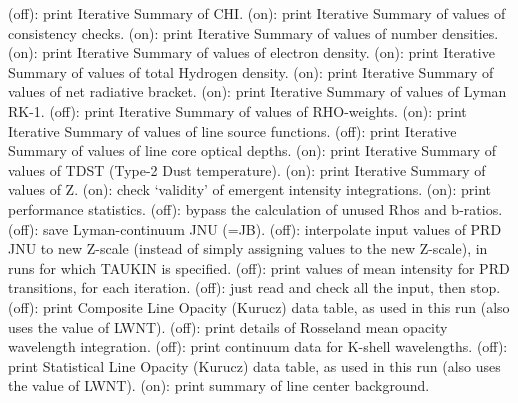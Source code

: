 \space \vbox { (off): \bang
print Iterative Summary of CHI.}
\space \vbox { (on): \bang
print Iterative Summary of values of consistency checks.}
\space \vbox { (on): \bang
print Iterative Summary of values of number densities.}
\space \vbox { (on): \bang
print Iterative Summary of values of electron density.}
\space \vbox { (on): \bang
print Iterative Summary of values of total Hydrogen density.}
\space \vbox { (on): \bang
print Iterative Summary of values of net radiative bracket.}
\space \vbox { (on): \bang
print Iterative Summary of values of Lyman RK-1.}
\space \vbox { (off): \bang
print Iterative Summary of values of RHO-weights.}
\space \vbox { (on): \bang
print Iterative Summary of values of line source functions.}
\space \vbox { (off): \bang
print Iterative Summary of values of line core optical depths.}
\space \vbox { (on): \bang
print Iterative Summary of values of TDST (Type-2 Dust temperature).}
\space \vbox { (on): \bang
print Iterative Summary of values of Z.}
\space \vbox { (on): \bang
check `validity' of emergent intensity integrations.}
\space \vbox { (on): \bang
print performance statistics.}
\space \vbox { (off): \bang
bypass the calculation of unused Rhos and b-ratios.}
\space \vbox { (off): \bang
save Lyman-continuum JNU (=JB).}
\space \vbox { (off): \bang
interpolate input values of PRD JNU to new Z-scale (instead of simply
assigning values to the new Z-scale), in runs for which TAUKIN is
specified.}
\space \vbox { (off): \bang
print values of mean intensity for PRD transitions, for each iteration.}
\space \vbox { (off): \bang
just read and check all the input, then stop.}
\space \vbox { (off): \bang
print Composite Line Opacity (Kurucz) data table, as used in this run
(also uses the value of LWNT).}
\space \vbox { (off): \bang
print details of Rosseland mean opacity wavelength integration.}
\space \vbox { (off): \bang 
print continuum data for K-shell wavelengths.}
\space \vbox { (off): \bang
print Statistical Line Opacity (Kurucz) data table, as used in this run
(also uses the value of LWNT).}
\space \vbox { (on): \bang
print summary of line center background.}
